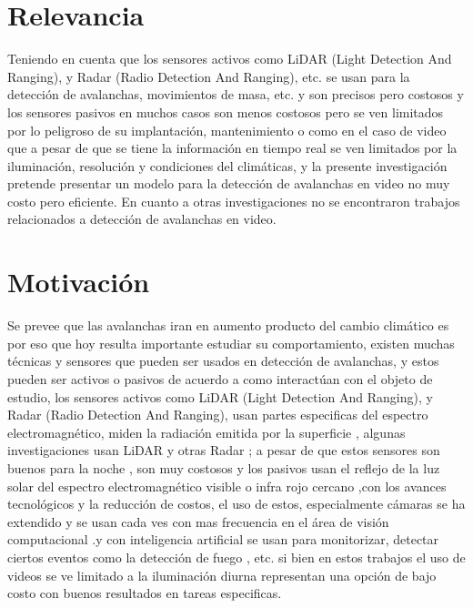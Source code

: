 \documentclass[a4paper,11pt]{report}
\begin{document}
\section{Relevancia}
 
 Teniendo en cuenta  que los sensores activos como LiDAR (Light Detection And Ranging), y Radar (Radio Detection And Ranging), etc. se usan para la detección de avalanchas, movimientos de masa, etc. y son precisos pero costosos y los sensores pasivos en muchos casos son menos costosos pero se ven limitados por lo peligroso de su implantación, mantenimiento o  como en el caso de video que a pesar de que se tiene la información en tiempo real se ven limitados por la iluminación, resolución  y condiciones del climáticas, y la presente investigación pretende presentar un modelo para la detección de avalanchas en video no muy costo pero eficiente. En cuanto a otras investigaciones no se encontraron trabajos relacionados a detección de avalanchas en video.

\section{Motivación}

Se prevee que las avalanchas iran en aumento producto del cambio climático es por eso que hoy resulta importante estudiar su comportamiento, existen muchas técnicas y sensores que pueden ser usados en detección de avalanchas,  y estos pueden ser activos	 o pasivos de acuerdo  a como interactúan con el objeto de estudio, los sensores activos como LiDAR (Light Detection And Ranging), y Radar (Radio Detection And Ranging), usan partes especificas del espectro electromagnético, miden la radiación emitida por la superficie \cite{Eckerstorfer2016}, algunas investigaciones usan LiDAR \cite{Deems2013} y  otras  Radar \cite{Schimmel2017,Long2016}; a pesar de que estos sensores son buenos para la noche \cite{Long2016}, son muy costosos y los pasivos usan el reflejo de la luz solar del espectro electromagnético visible o infra rojo cercano \cite{Fuchs2019},con los avances tecnológicos y la reducción de costos, el uso de estos, especialmente cámaras se ha extendido y se usan cada ves con mas frecuencia en el área de visión computacional  \cite{Jesus2018}.y con  inteligencia artificial se usan para monitorizar, detectar ciertos eventos como la detección de fuego \cite{Muhammad2019}, etc. si bien en estos trabajos el uso de videos se ve limitado a la iluminación diurna representan una opción de bajo costo con buenos resultados en tareas especificas. 
\end{document}
